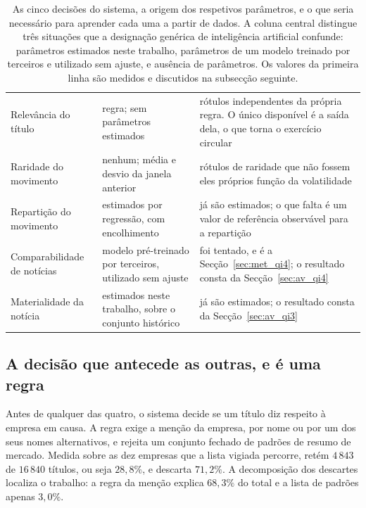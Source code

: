 \begin{table}[!htbp]
\caption[Onde entra a aprendizagem, decisão a decisão]{As cinco decisões do sistema, a origem
dos respetivos parâmetros, e o que seria necessário para aprender cada uma a partir de dados.
A coluna central distingue três situações que a designação genérica de inteligência artificial
confunde: parâmetros estimados neste trabalho, parâmetros de um modelo treinado por terceiros e
utilizado sem ajuste, e ausência de parâmetros. Os valores da primeira linha são medidos e discutidos na
subsecção seguinte.}
\label{tab:met_onde_ia}
\centering
\small
\begin{tabular}{L{0.20\textwidth} L{0.24\textwidth} L{0.44\textwidth}}
\toprule
{} &  &  \\
\midrule
Relevância do título & regra; sem parâmetros estimados & rótulos independentes da própria
regra. O único disponível é a saída dela, o que torna o exercício circular \\
\addlinespace
Raridade do movimento & nenhum; média e desvio da janela anterior & rótulos de raridade que não
fossem eles próprios função da volatilidade \\
\addlinespace
Repartição do movimento & estimados por regressão, com encolhimento & já são estimados; o que
falta é um valor de referência observável para a repartição \\
\addlinespace
Comparabilidade de notícias & modelo pré-treinado por terceiros, utilizado sem ajuste & foi
tentado, e é a Secção~\ref{sec:met_qi4}; o resultado consta da Secção~\ref{sec:av_qi4} \\
\addlinespace
Materialidade da notícia & estimados neste trabalho, sobre o conjunto histórico & já são
estimados; o resultado consta da Secção~\ref{sec:av_qi3} \\
\bottomrule
\end{tabular}
\end{table}

\subsection*{A decisão que antecede as outras, e é uma regra}
\label{sec:met_relevancia_nota}

Antes de qualquer das quatro, o sistema decide se um título diz respeito à empresa em causa. A
regra exige a menção da empresa, por nome ou por um dos seus nomes alternativos, e rejeita um
conjunto fechado de padrões de resumo de mercado. Medida sobre as dez empresas que a lista
vigiada percorre, retém $4\,843$ de $16\,840$ títulos, ou seja $28{,}8\%$, e descarta
$71{,}2\%$. A decomposição dos descartes localiza o trabalho: a regra da menção explica
$68{,}3\%$ do total e a lista de padrões apenas $3{,}0\%$.

